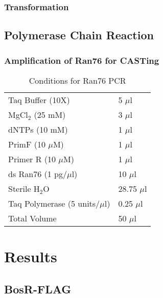 \documentclass[12pt,twoside]{reedthesis}
\begin{document}
   \subsection*{Transformation}
   
   \section*{Polymerase Chain Reaction}
   
   \subsection*{Amplification of Ran76 for CASTing}
   
\begin{table}
	\caption{Conditions for Ran76 PCR} 
	\label{Ran76PCR}
	\begin{tabular}{|l | l|}
		\hline
		Taq Buffer (10X) & 5 $\mu$l \\ 
		MgCl$_{2}$ (25 mM) & 3 $\mu$l \\  
		dNTPs (10 mM) & 1 $\mu$l \\   
		PrimF (10 $\mu$M) & 1 $\mu$l \\ 
		Primer R (10 $\mu$M) & 1 $\mu$l \\  			
		ds Ran76 (1 pg/$\mu$l) & 10 $\mu$l \\  
		Sterile H$_{2}$O & 28.75 $\mu$l \\
		Taq Polymerase (5 units/$\mu$l) & 0.25 $\mu$l \\
		\hline   
		Total Volume & 50 $\mu$l  \\
		\hline
	\end{tabular}
\end{table}


   
  \chapter*{Results}
  
  
  \section*{BosR-FLAG}
  
\end{document}

